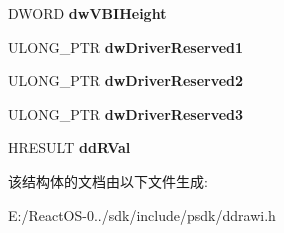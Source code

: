 \begin{DoxyCompactItemize}
D\+W\+O\+RD {\bfseries dw\+V\+B\+I\+Height}
\item 
\mbox{\label{struct___d_d_h_a_l___s_y_n_c_v_i_d_e_o_p_o_r_t_d_a_t_a_ad723b5775078734386910df4135b49f1}} 
U\+L\+O\+N\+G\+\_\+\+P\+TR {\bfseries dw\+Driver\+Reserved1}
\item 
\mbox{\label{struct___d_d_h_a_l___s_y_n_c_v_i_d_e_o_p_o_r_t_d_a_t_a_aae5f1e9900ff744fbac5b2cd6f343ac4}} 
U\+L\+O\+N\+G\+\_\+\+P\+TR {\bfseries dw\+Driver\+Reserved2}
\item 
\mbox{\label{struct___d_d_h_a_l___s_y_n_c_v_i_d_e_o_p_o_r_t_d_a_t_a_a47a1dadb6ed4794b33ae17ef9e18c897}} 
U\+L\+O\+N\+G\+\_\+\+P\+TR {\bfseries dw\+Driver\+Reserved3}
\item 
\mbox{\label{struct___d_d_h_a_l___s_y_n_c_v_i_d_e_o_p_o_r_t_d_a_t_a_a966d8d3571af99f7dfef17fee07f6c35}} 
H\+R\+E\+S\+U\+LT {\bfseries dd\+R\+Val}
\end{DoxyCompactItemize}


该结构体的文档由以下文件生成\+:\begin{DoxyCompactItemize}
\item 
E\+:/\+React\+O\+S-\/0../sdk/include/psdk/ddrawi.\+h\end{DoxyCompactItemize}
